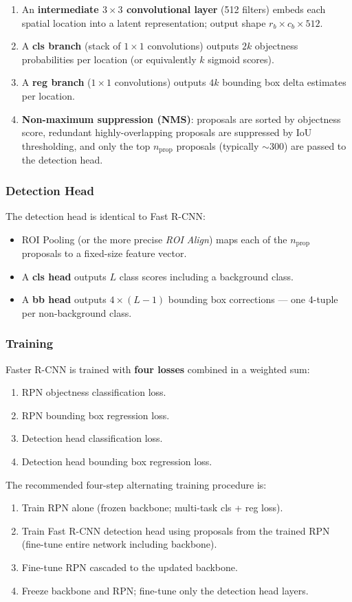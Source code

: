 \documentclass[11pt,a4paper]{article}
\begin{document}
\begin{enumerate}
  \item An \textbf{intermediate $3 \times 3$ convolutional layer} (512 filters) embeds each spatial location into a latent representation; output shape $r_b \times c_b \times 512$.
  \item A \textbf{cls branch} (stack of $1 \times 1$ convolutions) outputs $2k$ objectness probabilities per location (or equivalently $k$ sigmoid scores).
  \item A \textbf{reg branch} ($1 \times 1$ convolutions) outputs $4k$ bounding box delta estimates per location.
  \item \textbf{Non-maximum suppression (NMS)}: proposals are sorted by objectness score, redundant highly-overlapping proposals are suppressed by IoU thresholding, and only the top $n_\text{prop}$ proposals (typically $\sim$300) are passed to the detection head.
\end{enumerate}

\subsubsection{Detection Head}

The detection head is identical to Fast R-CNN:
\begin{itemize}
  \item ROI Pooling (or the more precise \emph{ROI Align}) maps each of the $n_\text{prop}$ proposals to a fixed-size feature vector.
  \item A \textbf{cls head} outputs $L$ class scores including a background class.
  \item A \textbf{bb head} outputs $4 \times (L-1)$ bounding box corrections — one 4-tuple per non-background class.
\end{itemize}

\subsubsection{Training}

Faster R-CNN is trained with \textbf{four losses} combined in a weighted sum:
\begin{enumerate}
  \item RPN objectness classification loss.
  \item RPN bounding box regression loss.
  \item Detection head classification loss.
  \item Detection head bounding box regression loss.
\end{enumerate}
The recommended four-step alternating training procedure is:
\begin{enumerate}
  \item Train RPN alone (frozen backbone; multi-task cls + reg loss).
  \item Train Fast R-CNN detection head using proposals from the trained RPN (fine-tune entire network including backbone).
  \item Fine-tune RPN cascaded to the updated backbone.
  \item Freeze backbone and RPN; fine-tune only the detection head layers.
\end{enumerate}
\end{document}
